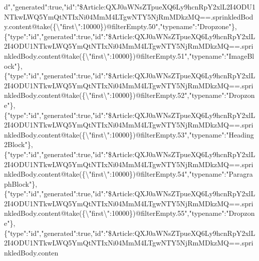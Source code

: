 d","generated":true,"id":"\$Article:QXJ0aWNsZTpueXQ6Ly9hcnRpY2xlL2I4ODU1NTkwLWQ5YmQtNTIxNi04MmM4LTgwNTY5NjRmMDkzMQ==.sprinkledBody.content@take(\{\textbackslash{}"first\textbackslash{}":10000\})@filterEmpty.50","typename":"Dropzone"\},\{"type":"id","generated":true,"id":"\$Article:QXJ0aWNsZTpueXQ6Ly9hcnRpY2xlL2I4ODU1NTkwLWQ5YmQtNTIxNi04MmM4LTgwNTY5NjRmMDkzMQ==.sprinkledBody.content@take(\{\textbackslash{}"first\textbackslash{}":10000\})@filterEmpty.51","typename":"ImageBlock"\},\{"type":"id","generated":true,"id":"\$Article:QXJ0aWNsZTpueXQ6Ly9hcnRpY2xlL2I4ODU1NTkwLWQ5YmQtNTIxNi04MmM4LTgwNTY5NjRmMDkzMQ==.sprinkledBody.content@take(\{\textbackslash{}"first\textbackslash{}":10000\})@filterEmpty.52","typename":"Dropzone"\},\{"type":"id","generated":true,"id":"\$Article:QXJ0aWNsZTpueXQ6Ly9hcnRpY2xlL2I4ODU1NTkwLWQ5YmQtNTIxNi04MmM4LTgwNTY5NjRmMDkzMQ==.sprinkledBody.content@take(\{\textbackslash{}"first\textbackslash{}":10000\})@filterEmpty.53","typename":"Heading2Block"\},\{"type":"id","generated":true,"id":"\$Article:QXJ0aWNsZTpueXQ6Ly9hcnRpY2xlL2I4ODU1NTkwLWQ5YmQtNTIxNi04MmM4LTgwNTY5NjRmMDkzMQ==.sprinkledBody.content@take(\{\textbackslash{}"first\textbackslash{}":10000\})@filterEmpty.54","typename":"ParagraphBlock"\},\{"type":"id","generated":true,"id":"\$Article:QXJ0aWNsZTpueXQ6Ly9hcnRpY2xlL2I4ODU1NTkwLWQ5YmQtNTIxNi04MmM4LTgwNTY5NjRmMDkzMQ==.sprinkledBody.content@take(\{\textbackslash{}"first\textbackslash{}":10000\})@filterEmpty.55","typename":"Dropzone"\},\{"type":"id","generated":true,"id":"\$Article:QXJ0aWNsZTpueXQ6Ly9hcnRpY2xlL2I4ODU1NTkwLWQ5YmQtNTIxNi04MmM4LTgwNTY5NjRmMDkzMQ==.sprinkledBody.conten
